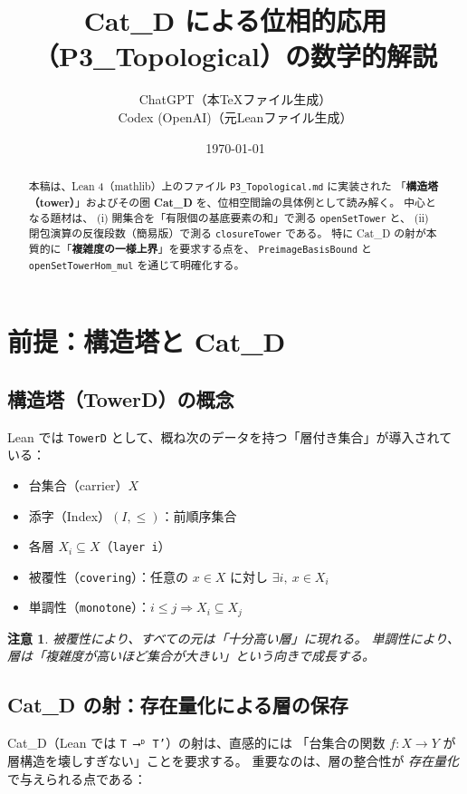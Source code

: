 \documentclass[a4paper,11pt]{article}
\title{Cat\_D による位相的応用（P3\_Topological）の数学的解説}
\author{ChatGPT（本TeXファイル生成）\\Codex (OpenAI)（元Leanファイル生成）}
\date{\today}
\newtheorem{remark}[definition]{注意}
\begin{document}
\maketitle

\begin{abstract}
本稿は、Lean 4（mathlib）上のファイル \texttt{P3\_Topological.md} に実装された
「\textbf{構造塔（tower）}」およびその圏 \textbf{Cat\_D} を、位相空間論の具体例として読み解く。
中心となる題材は、
(i) 開集合を「有限個の基底要素の和」で測る \texttt{openSetTower} と、
(ii) 閉包演算の反復段数（簡易版）で測る \texttt{closureTower} である。
特に Cat\_D の射が本質的に「\textbf{複雑度の一様上界}」を要求する点を、
\texttt{PreimageBasisBound} と \texttt{openSetTowerHom\_mul} を通じて明確化する。
\end{abstract}

\tableofcontents

\section{前提：構造塔と Cat\_D}

\subsection{構造塔（TowerD）の概念}
Lean では \texttt{TowerD} として、概ね次のデータを持つ「層付き集合」が導入されている：
\begin{itemize}
  \item 台集合（carrier）$X$
  \item 添字（Index）$(I,\le)$：前順序集合
  \item 各層 $X_i \subseteq X$（\texttt{layer i}）
  \item 被覆性（\texttt{covering}）：任意の $x\in X$ に対し $\exists i,\ x\in X_i$
  \item 単調性（\texttt{monotone}）：$i\le j \Rightarrow X_i\subseteq X_j$
\end{itemize}

\begin{remark}
被覆性により、すべての元は「十分高い層」に現れる。
単調性により、層は「複雑度が高いほど集合が大きい」という向きで成長する。
\end{remark}

\subsection{Cat\_D の射：存在量化による層の保存}
Cat\_D（Lean では \texttt{T ⟶ᴰ T'}）の射は、直感的には
「台集合の関数 $f:X\to Y$ が層構造を壊しすぎない」ことを要求する。
重要なのは、層の整合性が \emph{存在量化} で与えられる点である：
\end{document}
